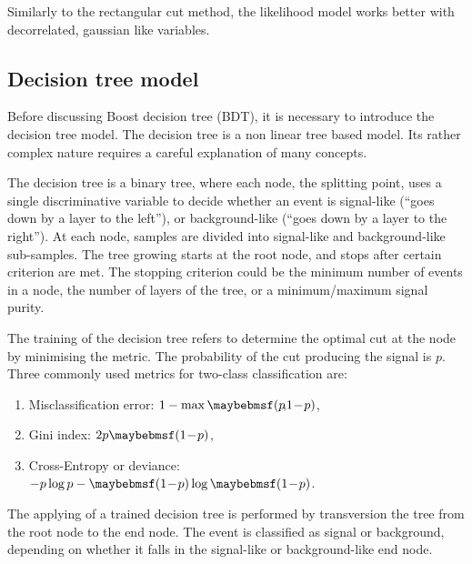 Similarly to the rectangular cut method, the likelihood model works better with decorrelated, gaussian like variables.



\subsection{Decision tree model}
\label{sec:pandoraDecisionTree}

Before discussing Boost decision tree (BDT), it is necessary to introduce the decision tree model. The decision tree is a non linear tree based model. Its rather complex nature requires a careful explanation of many concepts.

The decision tree is a binary tree, where each node, the splitting point, uses a single discriminative variable to decide whether an event is signal-like (``goes down by a layer to the left''), or background-like (``goes down by a layer to the right''). At each node, samples are divided into signal-like and background-like sub-samples. The tree growing starts at the root node, and stops after certain criterion are met. The stopping criterion could be the minimum number of events in a node, the number of layers of the tree, or a minimum/maximum signal purity.

The training of the decision tree refers to determine the optimal cut at the node by minimising the metric. The probability of the cut producing the signal is $p$. Three commonly used metrics for two-class classification are:
\begin{enumerate}
\item Misclassification error:  $1 - \max\parenths{p\!,\!1\!-\!p}$,
\item Gini index: $2p\parenths{1\!-\!p}$,
\item Cross-Entropy or deviance: $-p\log{p}-\parenths{1\!-\!p}\log\parenths{1\!-\!p}$.
\end{enumerate}

The applying of a trained decision tree is performed by transversion the tree from the root node to the end node. The event is classified as signal or background, depending on whether it falls in the signal-like or background-like end node.



